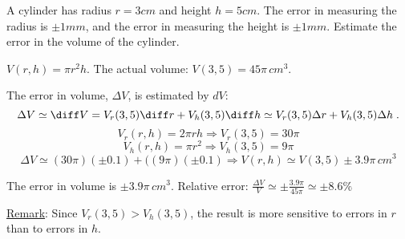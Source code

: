 \begin{frame}
\begin{example}
A cylinder has radius $r=3cm$ and height $h=5cm$. The error in measuring the radius is $\pm 1 mm$, and the error in measuring the height is $\pm 1 mm$. Estimate the error in the volume of the cylinder.
\pause

$V(r,h) = \pi r^2 h$. The actual volume: $V(3,5) = 45\pi \, cm^3$.

\pause
The error in volume, $\Delta V$, is estimated by $dV$:
%
$$\Delta V \simeq \diff V = V _r(3,5) \diff r + V_h(3,5) \diff h \simeq V _r(3,5) \Delta r + V_h(3,5) \Delta h\; .$$
%
$$V_r(r,h) = 2\pi r h \Longrightarrow V_r(3,5) = 30 \pi$$
%
$$V_h(r,h) = \pi r^2 \Longrightarrow V_h(3,5) = 9\pi$$
%
$$\Delta V  \simeq (30\pi) (\pm 0.1) + ((9\pi)(\pm 0.1) \Longrightarrow V(r,h) \simeq V(3,5) \pm 3.9\pi \, cm^3$$

The error in volume is $\pm 3.9\pi \, cm^3$. \pause
Relative error:
$\frac{\Delta V}{V} \simeq \pm \frac{3.9 \pi}{45\pi} \simeq \pm 8.6\%$

\pause
\underline{Remark}: Since $V_r(3,5) > V_h(3,5)$, the result is more sensitive to errors in $r$ than to errors in $h$.
\end{example}
\end{frame}